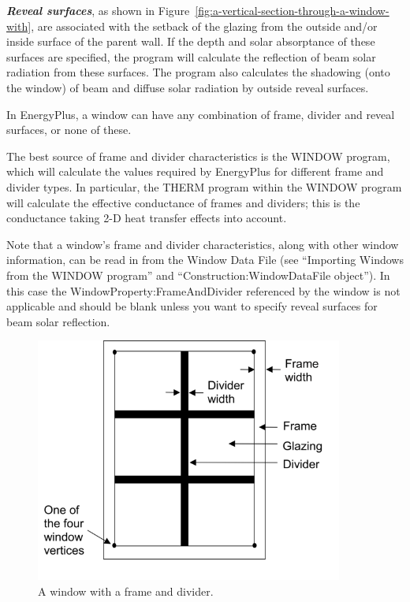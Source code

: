 \textbf{\emph{Reveal surfaces}}, as shown in Figure~\ref{fig:a-vertical-section-through-a-window-with}, are associated with the setback of the glazing from the outside and/or inside surface of the parent wall. If the depth and solar absorptance of these surfaces are specified, the program will calculate the reflection of beam solar radiation from these surfaces. The program also calculates the shadowing (onto the window) of beam and diffuse solar radiation by outside reveal surfaces.

In EnergyPlus, a window can have any combination of frame, divider and reveal surfaces, or none of these.

The best source of frame and divider characteristics is the WINDOW program, which will calculate the values required by EnergyPlus for different frame and divider types. In particular, the THERM program within the WINDOW program will calculate the effective conductance of frames and dividers; this is the conductance taking 2-D heat transfer effects into account.

Note that a window's frame and divider characteristics, along with other window information, can be read in from the Window Data File (see ``Importing Windows from the WINDOW program'' and ``Construction:WindowDataFile object''). In this case the WindowProperty:FrameAndDivider referenced by the window is not applicable and should be blank unless you want to specify reveal surfaces for beam solar reflection.

\begin{figure}[hbtp] %
\centering
\includegraphics[width=0.9\textwidth, height=0.9\textheight, keepaspectratio=true]{media/image061.png}
\caption{A window with a frame and divider. \protect \label{fig:a-window-with-a-frame-and-divider.}}
\end{figure}

